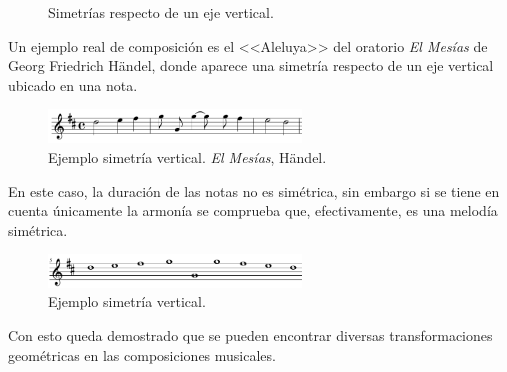 \documentclass[a4paper, openright, 11pt, titlepage]{report}
\theoremstyle{definition}\newtheorem{defin}[propo]{Definition}
\theoremstyle{definition}\newtheorem{obser}[propo]{Remark}
\theoremstyle{definition}\newtheorem{ejem}[propo]{Ejemplo}
\theoremstyle{definition}\newtheorem{algoritmo}[propo]{Algoritmo}
\begin{document}
\begin{itemize}
\begin{itemize}
\begin{figure}[H]
        \caption{Simetrías respecto de un eje vertical.}
        \end{figure}
        Un ejemplo real de composición es el <<Aleluya>> del oratorio \textit{El Mesías} de Georg Friedrich Händel, donde aparece una simetría respecto de un eje vertical ubicado en una nota.
        \begin{figure}[H]
            \centering
            \includegraphics[width = 0.6\textwidth]{simetriaHandel.png}
            \caption{Ejemplo simetría vertical. \textit{El Mesías}, Händel.}
        \end{figure}
        En este caso, la duración de las notas no es simétrica, sin embargo si se tiene en cuenta únicamente la armonía se comprueba que, efectivamente, es una melodía simétrica.
        \begin{figure}[H]
            \centering
            \includegraphics[width = 0.6\textwidth]{simetriaHandel2.png}
            \caption{Ejemplo simetría vertical.}
        \end{figure}       
    \end{itemize}
\end{itemize}
Con esto queda demostrado que se pueden encontrar diversas transformaciones geométricas en las composiciones musicales.
    
\end{document}
